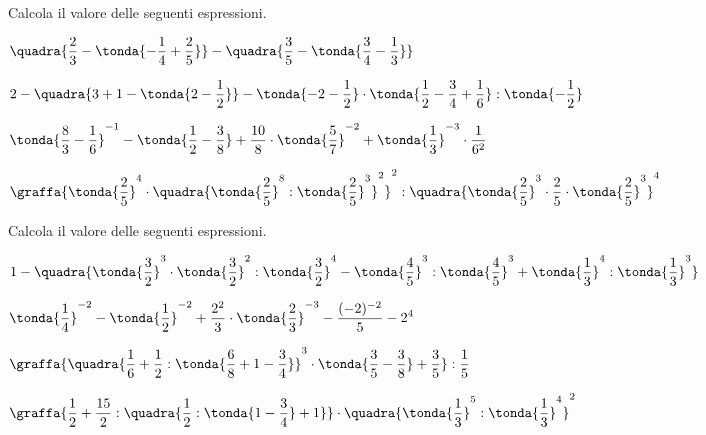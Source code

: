 
\begin{esercizio}[*]
\label{ese:3.148}
 Calcola il valore delle seguenti espressioni.
\begin{enumeratees}
\spazielenx
\item \(\displaystyle{\quadra{\frac{2}{3}-\tonda{-\frac{1}{4}+\frac{2}{5}}
}-\quadra{\frac{3}{5}-%
\tonda{\frac{3}{4}-\frac{1}{3}}}}\)
\item \(\displaystyle{2-\quadra{3+1-\tonda{2-\frac{1}{2}}}-
\tonda{-2-\frac{1}{2}}\cdot%
\tonda{\frac{1}{2}-\frac{3}{4}+\frac{1}{6}}:\tonda{-{\frac{1}{2}}}}\)
\item \(\displaystyle{\tonda{\frac{8}{3}-\frac{1}{6}}^{-1}-
\tonda{\frac{1}{2}-\frac{3}{8}}+\frac{10}{8}\cdot%
\tonda{\frac{5}{7}}^{-2}+\tonda{\frac{1}{3}}^{-3}\cdot
\frac{1}{6^{2}}}\)
\item \(\displaystyle{\graffa{\tonda{\frac{2}{5}}^{4}\cdot
\quadra{\tonda{\frac{2}{5}}^{8}:%
\tonda{\frac{2}{5}}^{3}}^{2}}^{2}:
\quadra{\tonda{\frac{2}{5}}^{3}\cdot{\frac{2}{5}}\cdot%
\tonda{\frac{2}{5}}^{3}}^{4}}\)
\end{enumeratees}
\end{esercizio}

\begin{esercizio}[*]
\label{ese:3.149}
Calcola il valore delle seguenti espressioni.
\begin{enumeratees}
\spazielenx
\item \(\displaystyle{1-\quadra{\tonda{\frac{3}{2}}^{3}\cdot%
\tonda{\frac{3}{2}}^{2}:\tonda{\frac{3}{2}}^{4}-
\tonda{\frac{4}{5}}^{3}:\tonda{\frac{4}{5}}^{3}+%
\tonda{\frac{1}{3}}^{4}:\tonda{\frac{1}{3}}^{3}}}\)
\item 
\(\displaystyle{\tonda{\frac{1}{4}}^{-2}-\tonda{\frac{1}{2}}^{-2}+
\frac{2^{2}}{3}\cdot%
\tonda{\frac{2}{3}}^{-3}-\frac{(-2)^{-2}}{5}-2^{4}}\)
\item 
\(\displaystyle{\graffa{\quadra{\frac{1}{6}+\frac{1}{2}:\tonda{\frac{6}{8}+1-
\frac{3}{4}}}^{3}\cdot%
\tonda{\frac{3}{5}-\frac{3}{8}}+\frac{3}{5}}:\frac{1}{5}}\)
\item \(\displaystyle{\graffa{\frac{1}{2}+\frac{15}{2}:\quadra{\frac{1}{2}:
\tonda{1-\frac{3}{4}}+1}}\cdot%
\quadra{\tonda{\frac{1}{3}}^{5}:\tonda{\frac{1}{3}}^{4}}^{2}}\)
\end{enumeratees}
\end{esercizio}

